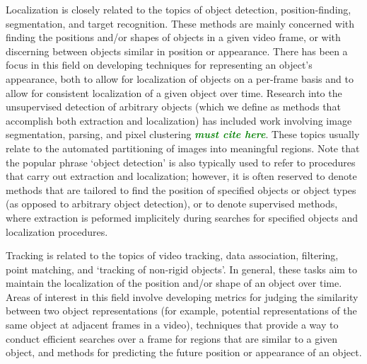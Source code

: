 \documentclass[smallcondensed, final]{svjour3}
\newcommand{\willie}[1]{\textcolor{green}{\textsf{\emph{\textbf{\textcolor{green}{#1}}}}}}
\begin{document}
Localization is closely related to the topics of object detection, position-finding, segmentation, and target recognition. These methods are mainly concerned with finding the positions and/or shapes of objects in a given video frame, or with discerning between objects similar in position or appearance. There has been a focus in this field on developing techniques for representing an object's appearance, both to allow for localization of objects on a per-frame basis and to allow for consistent localization of a given object over time. Research into the unsupervised detection of arbitrary objects (which we define as methods that accomplish both extraction and localization) has included work involving image segmentation, parsing, and pixel clustering \willie{must cite here}. These topics usually relate to the automated partitioning of images into meaningful regions. Note that the popular phrase `object detection' is also typically used to refer to procedures that carry out extraction and localization; however, it is often reserved to denote methods that are tailored to find the position of specified objects or object types (as opposed to arbitrary object detection), or to denote supervised methods, where extraction is peformed implicitely during searches for specified objects and localization procedures.

Tracking is related to the topics of video tracking, data association, filtering, point matching, and `tracking of non-rigid objects'. In general, these tasks aim to maintain the localization of the position and/or shape of an object over time. Areas of interest in this field involve developing metrics for judging the similarity between two object representations (for example, potential representations of the same object at adjacent frames in a video), techniques that provide a way to conduct efficient searches over a frame for regions that are similar to a given object, and methods for predicting the future position or appearance of an object. 
\end{document}

